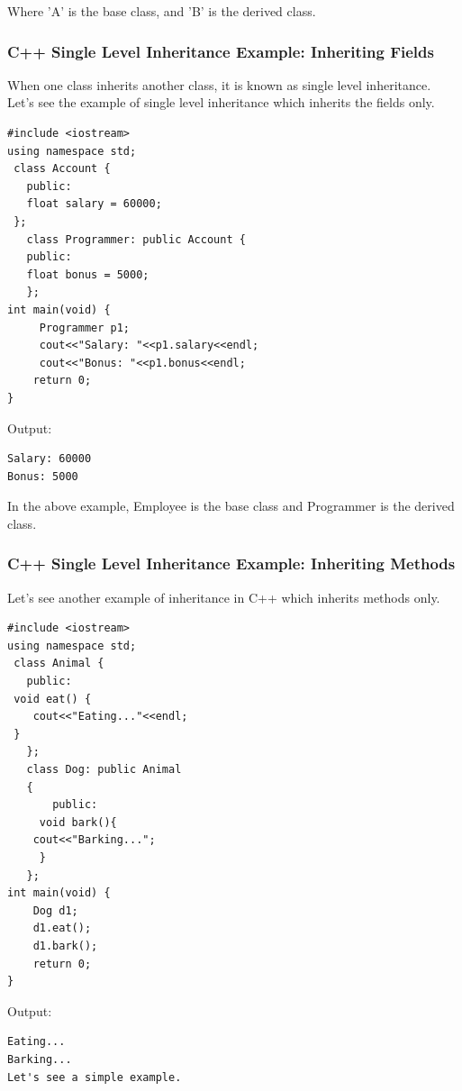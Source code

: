 \documentclass{book}
\begin{document}
Where 'A' is the base class, and 'B' is the derived class.

\subsubsection{C++ Single Level Inheritance Example: Inheriting Fields}

When one class inherits another class, it is known as single level inheritance. Let's see the example of single level inheritance which inherits the fields only.

\begin{lstlisting} 
#include <iostream>  
using namespace std;  
 class Account {  
   public:  
   float salary = 60000;   
 };  
   class Programmer: public Account {  
   public:  
   float bonus = 5000;    
   };       
int main(void) {  
	 Programmer p1;  
	 cout<<"Salary: "<<p1.salary<<endl;    
	 cout<<"Bonus: "<<p1.bonus<<endl;    
	return 0;  
}  
\end{lstlisting} 

Output:

\begin{verbatim}
Salary: 60000
Bonus: 5000

\end{verbatim}

In the above example, Employee is the base class and Programmer is the derived class.

\subsubsection{C++ Single Level Inheritance Example: Inheriting Methods}

Let's see another example of inheritance in C++ which inherits methods only.

\begin{lstlisting}
#include <iostream>  
using namespace std;  
 class Animal {  
   public:  
 void eat() {   
    cout<<"Eating..."<<endl;   
 }    
   };  
   class Dog: public Animal    
   {    
       public:  
     void bark(){  
    cout<<"Barking...";   
     }    
   };   
int main(void) {  
    Dog d1;  
    d1.eat();  
    d1.bark();  
    return 0;  
}  
\end{lstlisting}

Output:

\begin{verbatim}
Eating...
Barking...
Let's see a simple example.
\end{verbatim}
\end{document}
